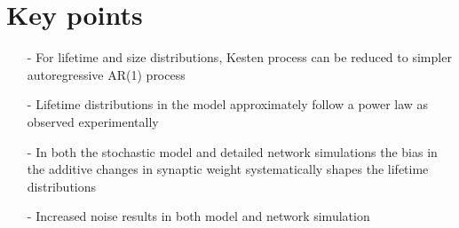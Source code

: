 \section{Key points}

\begin{itemize}
\item[-] For lifetime and size distributions, Kesten process can be reduced to simpler autoregressive AR(1) process
\item[-] Lifetime distributions in the model approximately follow a power law as observed experimentally
\item[-] In both the stochastic model and detailed network simulations the bias in the additive changes in synaptic weight systematically shapes the lifetime distributions
\item[-] Increased noise results in both model and network simulation 
\end{itemize}
